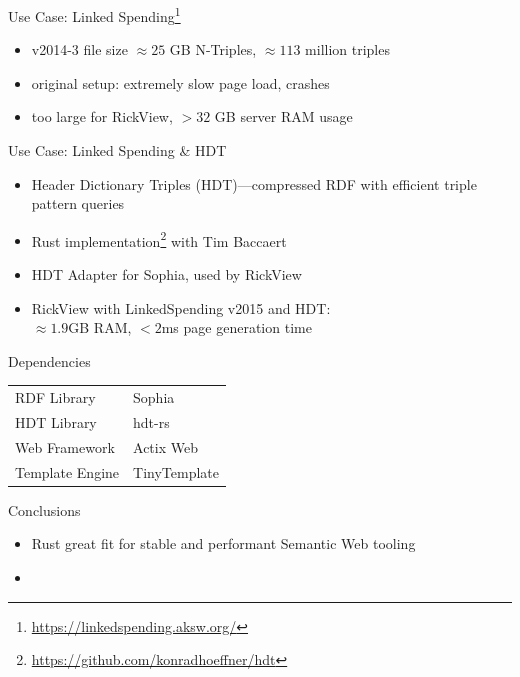 \documentclass[14pt,aspectratio=169]{beamer}
\begin{document}
\begin{frame}{Use Case: Linked Spending\footnote{\url{https://linkedspending.aksw.org/}}}
\begin{itemize}
\item v2014-3 file size $\approx 25$ GB N-Triples, $\approx 113$ million triples
\item original setup: extremely slow page load, crashes
\item too large for RickView, $> 32$ GB server RAM usage
\end{itemize}
\end{frame}

\begin{frame}{Use Case: Linked Spending \& HDT}
\begin{itemize}
\item Header Dictionary Triples (HDT)---compressed RDF with efficient triple pattern queries
\item Rust implementation\footnote{\url{https://github.com/konradhoeffner/hdt}} with Tim Baccaert
\item HDT Adapter for Sophia, used by RickView
\item RickView with LinkedSpending v2015 and HDT:\\$\approx 1.9$GB RAM,  $<2$ms page generation time
\end{itemize}
\end{frame}

\begin{frame}{Dependencies}
\begin{tabular}{ll}
RDF Library		&Sophia\\%
HDT Library		&hdt-rs\\
Web Framework	&Actix Web\\
Template Engine	&TinyTemplate\\
\end{tabular}
\end{frame}

\begin{frame}{Conclusions}
\begin{itemize}
\item Rust great fit for stable and performant Semantic Web tooling
\item 
\end{itemize}
\end{frame}
\end{document}
